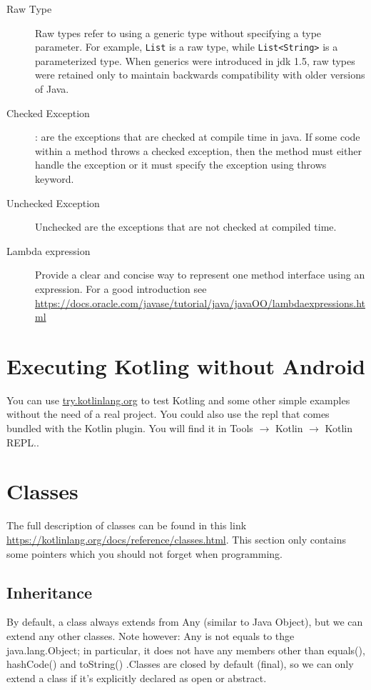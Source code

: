 \begin{description}
	\item[Raw Type] Raw types refer to using a generic type without specifying a type parameter. For example, \texttt{List} is a raw type, while \texttt{List<String>} is a parameterized type. When generics were introduced in \gls{jdk} 1.5, raw types were retained only to maintain backwards compatibility with older versions of Java.
	\item[Checked Exception]: are the exceptions that are checked at compile time in java. If some code within a method throws a checked exception, then the method must either handle the exception or it must specify the exception using throws keyword.
	\item[Unchecked Exception] Unchecked are the exceptions that are not checked at compiled time.
	\item[Lambda expression] Provide a clear and concise way to represent one method interface using an expression. For a good introduction see \url{https://docs.oracle.com/javase/tutorial/java/javaOO/lambdaexpressions.html}
\end{description}

\section{Executing Kotling without Android}

You can use \url{try.kotlinlang.org} to test Kotling and some other simple examples without the need of
a real project. You could also use the \gls{repl} that comes bundled with the Kotlin plugin. You will
find it in Tools $\rightarrow$ Kotlin $\rightarrow$ Kotlin REPL..

\section{Classes}
The full description of classes can be found in this link \url{https://kotlinlang.org/docs/reference/classes.html}. This section only contains some pointers which you should not forget when programming. 

\subsection{Inheritance}
By default, a class always extends from Any (similar to Java Object), but we can
extend any other classes. Note however: Any is not  equals to thge java.lang.Object; in particular, it does not have any members other than equals(), hashCode() and toString() .Classes are closed by default (final), so we can only extend
a class if it’s explicitly declared as open or abstract.

